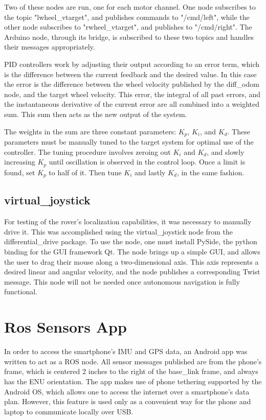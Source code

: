 Two of these nodes are run, one for each motor channel. One node subscribes to the topic "lwheel\_vtarget", and publishes commands to "/cmd/left", while the other node subscribes to "rwheel\_vtarget", and publishes to "/cmd/right". The Arduino node, through its bridge, is subscribed to these two topics and handles their messages appropriately.

PID controllers work by adjusting their output according to an error term, which is the difference between the current feedback and the desired value. In this case the error is the difference between the wheel velocity published by the diff\_odom node, and the target wheel velocity. This error, the integral of all past errors, and the instantaneous derivative of the current error are all combined into a weighted sum. This sum then acts as the new output of the system.

The weights in the sum are three constant parameters: \(K_p\), \(K_i\), and \(K_d\). These parameters must be manually tuned to the target system for optimal use of the controller. The tuning procedure involves zeroing out \(K_i\) and \(K_d\), and slowly increasing \(K_p\) until oscillation is observed in the control loop. Once a limit is found, set \(K_p\) to half of it. Then tune \(K_i\) and lastly \(K_d\), in the same fashion. 

\subsection{virtual\_joystick} \label{sectionJoystick}
For testing of the rover's localization capabilities, it was necessary to manually drive it. This was accomplished using the virtual\_joystick node from the  differential\_drive package. To use the node, one must install PySide, the python binding for the GUI framework Qt. The node brings up a simple GUI, and allows the user to drag their mouse along a two-dimensional axis. This axis represents a desired linear and angular velocity, and the node publishes a corresponding Twist message. This node will not be needed once autonomous navigation is fully functional.

\section{Ros Sensors App}
In order to access the smartphone's IMU and GPS data, an Android app was written to act as a ROS node. All sensor messages published are from the phone's frame, which is centered 2 inches to the right of the base\_link frame, and always has the ENU orientation. The app makes use of phone tethering supported by the Android OS, which allows one to access the internet over a smartphone's data plan. However, this feature is used only as a convenient way for the phone and laptop to communicate locally over USB.

